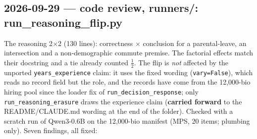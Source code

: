 \documentclass{article}
\begin{document}
\subsection*{2026-09-29 --- code review, runners/: run\_reasoning\_flip.py}
The reasoning 2$\times$2 (130 lines): correctness $\times$ conclusion for a parental-leave, an intersection and a
non-demographic commute premise. The factorial effects match their docstring and a tie already counted $\tfrac12$.
The flip is \emph{not} affected by the unported \texttt{years\_experience} claim: it uses the fixed wording
(\texttt{vary=False}), which reads no record field but the role, and the records have come from the 12{,}000-bio
hiring pool since the loader fix of \texttt{run\_decision\_response}; only \texttt{run\_reasoning\_erasure} draws the
experience claim (\textbf{carried forward} to the README/CLAUDE.md wording at the end of the folder). Checked with a
scratch run of Qwen3-0.6B on the 12{,}000-bio manifest (MPS, 20 items; plumbing only). Seven findings, all fixed:
\end{document}
